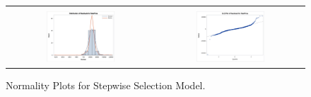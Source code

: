 \documentclass[11pt]{scrartcl} %
\begin{document}
\begin{figure}[H] %
	\centering
	\begin{tabular}{p{} p{}}
\hline	
	\multicolumn{1}{|c}{} &  \multicolumn{1}{c|}{} \\
		\multicolumn{1}{|c}{\includegraphics[width=0.48\textwidth]{../graphics/A2SWHist}} &
		\multicolumn{1}{c|}{\includegraphics[width=0.48\textwidth]{../graphics/A2SWqq}}\\
		\hline
	\end{tabular}		
	\caption{Normality Plots for Stepwise Selection Model.} %
	\label{fig:A2SWQQ}
\end{figure}
\end{document}
